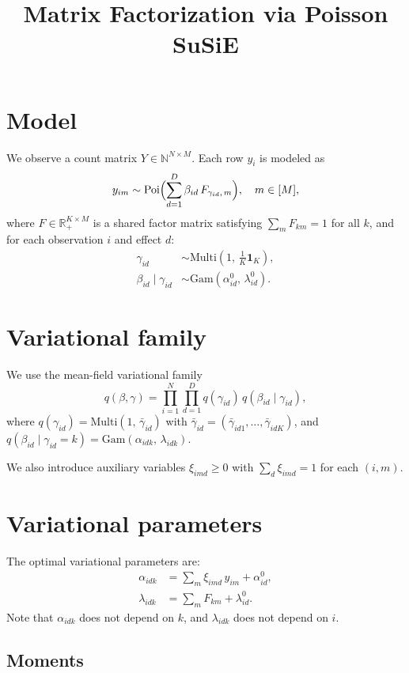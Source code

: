 \documentclass[11pt]{article}
\title{Matrix Factorization via Poisson SuSiE}
\author{}
\date{}
\newcommand{\Gam}{\mathrm{Gam}}
\newcommand{\Poi}{\mathrm{Poi}}
\newcommand{\Multi}{\mathrm{Multi}}
\newcommand{\gb}{\bar{\gamma}}
\theoremstyle{definition}
\begin{document}
\maketitle

\section{Model}

We observe a count matrix $Y \in \mathbb{N}^{N \times M}$. Each row $y_i$ is modeled as
\[
  y_{im} \sim \Poi\Bigl(\sum_{d=1}^{D} \beta_{id}\, F_{\gamma_{id},\, m}\Bigr), \quad m \in [M],
\]
where $F \in \mathbb{R}_+^{K \times M}$ is a shared factor matrix satisfying $\sum_m F_{km} = 1$ for all $k$, and for each observation $i$ and effect $d$:
\begin{align}
  \gamma_{id} &\sim \Multi(1,\, \tfrac{1}{K}\mathbf{1}_K), \\
  \beta_{id} \mid \gamma_{id} &\sim \Gam(\alpha_{id}^0,\, \lambda_{id}^0).
\end{align}

\section{Variational family}

We use the mean-field variational family
\[
  q(\beta, \gamma) = \prod_{i=1}^{N} \prod_{d=1}^{D} q(\gamma_{id})\, q(\beta_{id} \mid \gamma_{id}),
\]
where $q(\gamma_{id}) = \Multi(1,\, \gb_{id})$ with $\gb_{id} = (\gb_{id1}, \ldots, \gb_{idK})$, and $q(\beta_{id} \mid \gamma_{id} = k) = \Gam(\alpha_{idk},\, \lambda_{idk})$.

We also introduce auxiliary variables $\xi_{imd} \geq 0$ with $\sum_d \xi_{imd} = 1$ for each $(i, m)$.

\section{Variational parameters}

The optimal variational parameters are:
\begin{align}
  \alpha_{idk} &= \sum_m \xi_{imd}\, y_{im} + \alpha_{id}^0, \label{eq:alpha} \\
  \lambda_{idk} &= \sum_m F_{km} + \lambda_{id}^0. \label{eq:lambda}
\end{align}
Note that $\alpha_{idk}$ does not depend on $k$, and $\lambda_{idk}$ does not depend on $i$.

\subsection{Moments}
\end{document}
